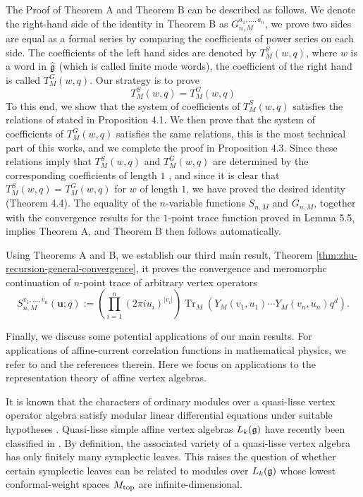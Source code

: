 \documentclass[11pt,a4paper]{amsart}
\numberwithin{equation}{section}
\theoremstyle{definition}
\theoremstyle{remark}
\DeclareMathOperator{\Tr}{Tr}
\newcommand{\ii}{i}
\newcommand{\ubf}{\boldsymbol u}
\begin{document}
The Proof of Theorem A  and Theorem B can be described as follows.  We denote the right-hand side of the identity in Theorem B as $ G_{n ,M}^{a_1 , \dots , a_n}$, we prove two sides are equal as a formal series by  comparing the coefficients of power series on each side. The coefficients of the left hand sides are denoted by $ T^S_M ( w , q )$, where $w $ is a word in $ \widehat{\frak g}$ (which is called finite mode words),
 the coefficient of the right hand is called $T^G_M ( w , q ) $. Our strategy is to prove 
 \[     T^S_M ( w , q ) = T^G_M ( w , q ) \]
To this end, we show that the system of coefficients of $ T^S_M ( w , q )$ satisfies the  relations of stated in Proposition 4.1. We then prove that
 the system of coefficients of  $T^G_M ( w , q )$ satisfies the same relations, this is the most technical part of this works, and we complete the proof in 
Proposition 4.3.  Since these relations imply that 
$T_M^S ( w , q ) $ and $ T_M^G ( w , q )$
are determined by the corresponding coefficients of length $1$
, and since it is clear that $T_M^S ( w , q ) = T_M^G ( w , q )$ for $w$ of length $1$,
 we have proved the desired identity (Theorem 4.4).
  The equality of the $ n$-variable functions 
 $S_{n, M }$ and $G_{n, M }$, together with the convergence results for the 
 $1$-point trace function proved in Lemma 5.5, implies Theorem A, and Theorem B then follows automatically. 
 
 Using Theorems A and B, we establish our third main result,
  Theorem \ref{thm:zhu-recursion-general-convergence}, it proves  the convergence and meromorphc continuation of $n$-point trace of arbitrary vertex operators 
 \begin{equation}
 S_{n,M}^{v_1,\ldots,v_n}(\ubf;q)
 :=\left(\prod_{i=1}^n(2\pi\ii u_i)^{|v_i|}\right)
 \Tr_M \left(Y_M(v_1,u_1)\cdots Y_M(v_n,u_n)q^d\right).
 \end{equation}

 
 Finally, we discuss some potential applications of our main results. For applications of affine-current correlation functions in mathematical physics, we refer to \cite{DolanGoddard} and the references therein. Here we focus on applications to the representation theory of affine vertex algebras.
 
 It is known that the characters of ordinary modules over a quasi-lisse vertex operator algebra satisfy modular linear differential equations under suitable hypotheses \cite{AK}. Quasi-lisse simple affine vertex algebras $L_k(\frak g)$ have recently been classified in \cite{ADS}. By definition, the associated variety of a quasi-lisse vertex algebra has only finitely many symplectic leaves. This raises the question of whether certain symplectic leaves can be related to modules over $L_k(\frak g)$ whose lowest conformal-weight spaces $M_{\rm top}$ are infinite-dimensional.
 
\end{document}
